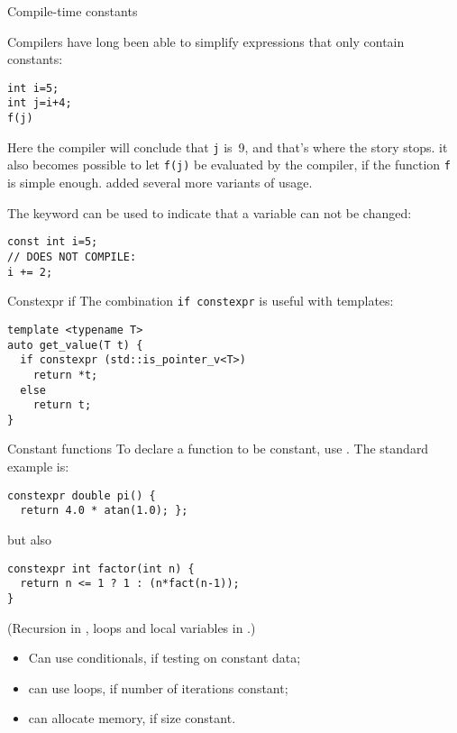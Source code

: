  {Compile-time constants}

Compilers have long been able to simplify expressions that only
contain constants:
\begin{lstlisting}
int i=5;
int j=i+4;
f(j)
\end{lstlisting}
Here the compiler will conclude that \lstinline{j} is~9, and that's
where the story stops. it also
becomes possible to let \lstinline{f(j)} be evaluated by the compiler,
if the function \lstinline{f} is simple enough.
 added several more variants of
 usage.

The  keyword can be used to indicate that a
variable can not be changed:
\begin{lstlisting}
const int i=5;
// DOES NOT COMPILE:
i += 2;
\end{lstlisting}

\begin{block}{Constexpr if}
  \label{sl:constexpr-if}
  The combination \lstinline{if constexpr} is useful with templates:
\begin{lstlisting}
template <typename T>
auto get_value(T t) {
  if constexpr (std::is_pointer_v<T>)
    return *t;
  else
    return t;
}
\end{lstlisting}
\end{block}

\begin{block}{Constant functions}
  \label{sl:constexpr}
  To declare a function to be constant, use
  . The standard example is:
\begin{lstlisting}
constexpr double pi() {
  return 4.0 * atan(1.0); };
\end{lstlisting}
but also
\begin{lstlisting}
constexpr int factor(int n) {
  return n <= 1 ? 1 : (n*fact(n-1));
}
\end{lstlisting}
(Recursion in ,
loops and local variables in .)
\end{block}

\begin{itemize}
\item Can use conditionals, if testing on constant data;
\item can use loops, if number of iterations constant;
\item {} can allocate memory, if size constant.
\end{itemize}

